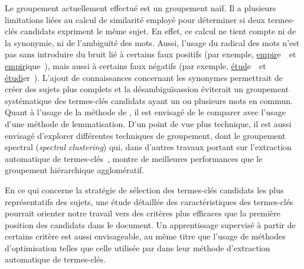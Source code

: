   Le groupement actuellement effectué est un groupement naïf. Il a plusieurs
  limitations liées au calcul de similarité employé pour déterminer si deux
  termes-clés candidats expriment le même sujet. En effet, ce calcul ne tient
  compte ni de la synonymie, ni de l'ambiguïté des mots. Aussi, l'usage du
  radical des mots n'est pas sans introduire du bruit lié à certains faux
  positifs (par exemple, \og \underline{empir}e~\fg\ et
  \og \underline{empir}ique~\fg), mais aussi à certains faux négatifs (par
  exemple, \og \underline{étud}e~\fg\ et \og \underline{étudi}er~\fg). L'ajout
  de connaissances concernant les synonymes permettrait de créer des sujets plus
  complets et la désambiguïsassion éviterait un groupement systématique des
  termes-clés candidats ayant un ou plusieurs mots en commun. Quant à l'usage de
  la méthode de , il est envisagé de le
  comparer avec l'usage d'une méthode de lemmatisation. D'un point de vue plus
  technique, il est aussi envisagé d'explorer différentes techniques de
  groupement, dont le groupement spectral (\textit{spectral clustering}) qui,
  dans d'autres travaux portant sur l'extraction automatique de
  termes-clés~\cite{liu2009keycluster}, montre de meilleures performances que le
  groupement hiérarchique agglomératif.

  En ce qui concerne la stratégie de sélection des termes-clés candidats les
  plus représentatifs des sujets, une étude détaillée des caractéristiques des
  termes-clés pourrait orienter notre travail vers des critères plus efficaces
  que la première position des candidats dans le document. Un apprentissage
  supervisé à partir de certains critère est aussi envisageable, au même titre
  que l'usage de méthodes d'optimisation telles que celle utilisée par
   dans leur méthode d'extraction
  automatique de termes-clés.

